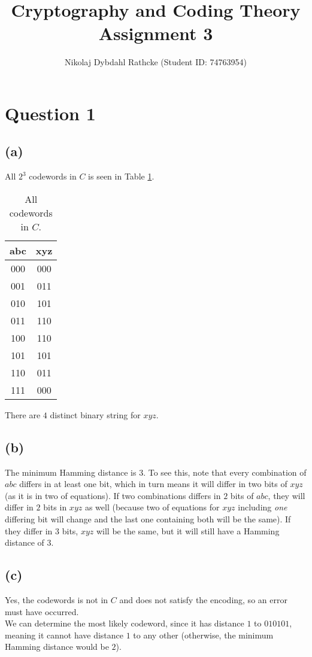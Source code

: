\documentclass[a4paper, fleqn]{article}
\author{Nikolaj Dybdahl Rathcke (Student ID: 74763954)}
\title{Cryptography and Coding Theory  \\ Assignment 3}
\begin{document}


\section{Question 1}
\subsection{(a)}
All $2^3$ codewords in $C$ is seen in Table \ref{tab1}.
\begin{table}[H]
  \centering
    \begin{tabular}{c|c}
      abc & xyz \\
      \hline
      000 & 000 \\
      \hline
      001 & 011 \\
      \hline
      010 & 101 \\
      \hline
      011 & 110 \\
      \hline
      100 & 110 \\
      \hline
      101 & 101 \\
      \hline
      110 & 011 \\
      \hline
      111 & 000
    \end{tabular}
    \caption{All codewords in $C$.}
    \label{tab1}
\end{table}
There are $4$ distinct binary string for $xyz$.

\subsection{(b)}
The minimum Hamming distance is $3$. To see this, note that every combination of $abc$
differs in at least one bit, which in turn means it will differ in two bits of $xyz$ (as
it is in two of equations). If two combinations differs in $2$ bits of $abc$, they will
differ in $2$ bits in $xyz$ as well (because two of equations for $xyz$ including \textit{one}
differing bit will change and the last one containing both will be the same). If they
differ in $3$ bits, $xyz$ will be the same, but it will still have a Hamming distance of
$3$.

\subsection{(c)}
Yes, the codewords is not in $C$ and does not satisfy the encoding, so an error must have
occurred. \\
We can determine the most likely codeword, since it has distance $1$ to $010101$, meaning
it cannot have distance $1$ to any other (otherwise, the minimum Hamming distance would
be $2$).
\end{document}
